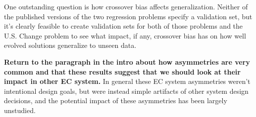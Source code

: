 \documentclass{sig-alternate}
\begin{document}
One outstanding question is how crossover bias affects generalization. Neither of the published versions 
of the two regression problems specify a validation set, but it's clearly feasible to create validation sets 
for both of those problems and the U.S. Change problem to see what impact, if any, crossover bias has 
on how well evolved solutions generalize to unseen data.

\textbf{Return to the paragraph in the intro about how asymmetries are very common and that these results suggest that we should look at their impact in other EC system.}
In general these 
EC system
asymmetries weren't intentional design goals, but were instead simple artifacts of other system design decisions, and 
the potential impact of these asymmetries has been largely unstudied.






\end{document}
